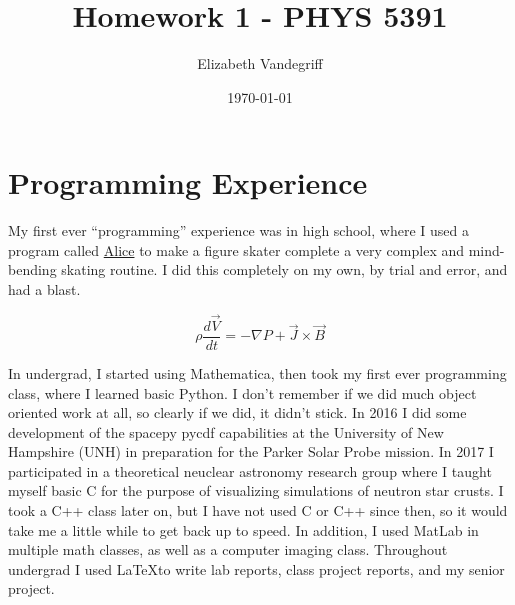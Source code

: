 \documentclass[12pt, letterpaper]{article}
\begin{document}
\title{Homework 1 - PHYS 5391}
\author{Elizabeth Vandegriff}
\date{\today}

\maketitle
\newpage
\tableofcontents
\newpage

\section{Programming Experience}


My first ever ``programming'' experience was in high school, where I  used a program called \href{https://www.alice.org/}{Alice} to make a figure skater complete a very complex and mind-bending skating routine. I did this completely on my own, by trial and error, and had a blast.

\begin{equation}
  \label{eq:2}
  \rho \frac{d \vec{V}}{dt} = - \nabla P + \vec{J} \times \vec{B}
\end{equation}

In undergrad, I started using Mathematica, then took my first ever programming class, where I learned basic Python. I don't remember if we did much object oriented work at all, so clearly if we did, it didn't stick. In 2016 I did some development of the spacepy pycdf capabilities at the University of New Hampshire (UNH) in preparation for the Parker Solar Probe mission. In 2017 I participated in a theoretical neuclear astronomy research group where I taught myself basic C for the purpose of visualizing simulations of neutron star crusts. I took a C++ class later on, but I have not used C or C++ since then, so it would take me a little while to get back up to speed. In addition, I used MatLab in multiple math classes, as well as a computer imaging class. Throughout undergrad I used \LaTeX to write lab reports, class project reports, and my senior project.
\end{document}
